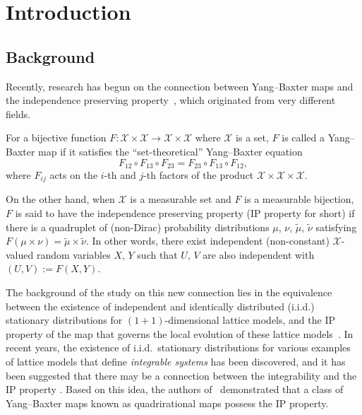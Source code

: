 \documentclass[pdftex]{sigma}
\numberwithin{equation}{section}
\begin{document}


\section{Introduction}

\subsection{Background}\label{section1.1}

Recently, research has begun on the connection between Yang--Baxter maps and the independence preserving property~\cite{SU}, which originated from very different fields.

For a bijective function $F\colon \mathcal{X} \times \mathcal{X} \to \mathcal{X} \times \mathcal{X}$ where $\mathcal{X}$ is a set, $F$ is called a Yang--Baxter map if it satisfies the ``set-theoretical'' Yang--Baxter equation
\begin{equation}\label{eq:YB}
F_{12} \circ F_{13} \circ F_{23} = F_{23} \circ F_{13} \circ F_{12},
\end{equation}
where $F_{ij}$ acts on the $i$-th and $j$-th factors of the product $\mathcal{X} \times \mathcal{X} \times \mathcal{X}$.

On the other hand, when $\mathcal{X}$ is a measurable set and $F$ is a measurable bijection, $F$ is said to have the independence preserving property (IP property for short) if there is a quadruplet of (non-Dirac) probability distributions $\mu$, $\nu$, $\tilde{\mu}$, $\tilde{\nu}$ satisfying $F( \mu \times \nu) = \tilde{\mu} \times \tilde{\nu}$. In other words, there exist independent (non-constant) $\mathcal{X}$-valued random variables $X$, $Y$ such that $U$, $V$ are also independent with $(U,V):=F(X,Y)$.

The background of the study on this new connection lies in the equivalence between the existence of independent and identically distributed (i.i.d.) stationary distributions for $(1+1)$-dimensional lattice models, and the IP property of the map that governs the local evolution of these lattice models~\cite{CSirf}. In recent years, the existence of i.i.d.\ stationary distributions for various examples of lattice models that define {\it integrable systems} has been discovered, and it has been suggested that there may be a connection between the integrability and the IP property \cite{CSirf,CS, CSsurvey}. Based on this idea, the authors of~\cite{SU} demonstrated that a class of Yang--Baxter maps known as quadrirational maps possess the IP property.
\end{document}
